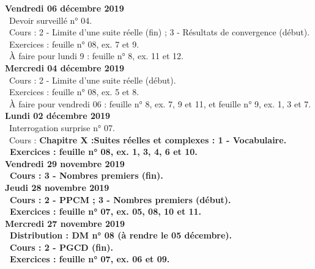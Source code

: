 \documentclass[12pt,a4paper]{article}
\begin{document}
\noindent\textbf{Vendredi 06 décembre 2019}\\
\bu\ Devoir surveillé n° 04.\\
\bu\ Cours : 2 - Limite d'une suite réelle (fin) ; 3 - Résultats de convergence (début).\\
\bu\ Exercices : feuille n° 08, ex. 7 et 9.\\
\bu\ À faire pour lundi 9 : feuille n° 8, ex. 11 et 12.\vspace{.4cm}\\
  
\noindent\textbf{Mercredi 04 décembre 2019}\\
\bu\ Cours : 2 - Limite d'une suite réelle (début).\\
\bu\ Exercices : feuille n° 08, ex. 5 et 8.\\
\bu\ À faire pour vendredi 06 : feuille n° 8, ex. 7, 9 et 11, et feuille n° 9, ex. 1, 3 et 7.\vspace{.4cm}\\

\noindent\textbf{Lundi 02 décembre 2019}\\
\bu\ Interrogation surprise n° 07.\\
\bu\ Cours : \bf Chapitre X :\rm Suites réelles et complexes : 1 - Vocabulaire.
\\
\bu\ Exercices : feuille n° 08, ex. 1, 3, 4, 6 et 10.\vspace{.4cm}\\

\noindent\textbf{Vendredi 29 novembre 2019}\\
\bu\ Cours : 3 - Nombres premiers (fin).\vspace{.4cm}\\


\noindent\textbf{Jeudi 28 novembre 2019}\\
\bu\ Cours : 2 - PPCM ; 3 - Nombres premiers (début).\\
\bu\ Exercices : feuille n° 07, ex. 05, 08, 10 et 11.\vspace{.4cm}\\
  
\noindent\textbf{\bf Mercredi 27 novembre 2019}\\
\bu\ Distribution : DM n° 08 (à rendre le 05 décembre).\\
\bu\ Cours : 2 - PGCD (fin).\\
\bu\ Exercices : feuille n° 07, ex. 06 et 09.\vspace{.4cm}\\
\end{document}
